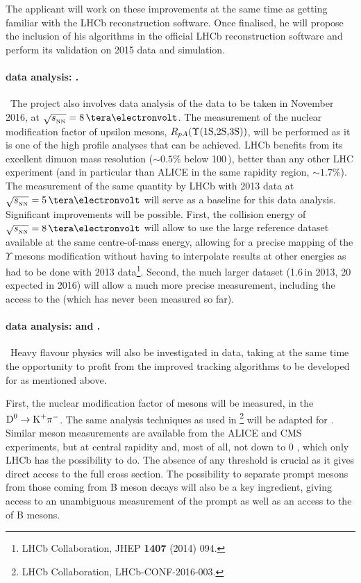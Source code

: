 \documentclass[a4paper,11pt]{article}
\begin{document}
The applicant will work on these improvements at the same time as getting familiar with the LHCb reconstruction software. Once finalised, he will propose the inclusion of his algorithms in the official LHCb reconstruction software and perform its validation on 2015 \pbpb data and simulation.


\paragraph{\pPb data analysis: \PgUabc. }\ 
The project also involves data analysis of the \pPb data to be taken in November 2016, at $\sqrtsnn = 8\,\TeV$. The measurement of the nuclear modification factor of upsilon mesons, $R_{pA} (\Upsilon\text{(1S,2S,3S)})$, will be performed as it is one of the high profile analyses that can be achieved. LHCb benefits from its excellent dimuon mass resolution ($\sim 0.5\%$ below 100\,\GeVc), better than any other LHC experiment (and in particular than ALICE in the same rapidity region, $\sim 1.7\%$). %
The measurement of the same quantity by LHCb with 2013 \pPb data at $\sqrtsnn = 5\,\TeV$ will serve as a baseline for this data analysis. Significant improvements will be possible. First, the collision energy of $\sqrtsnn = 8\,\TeV$ will allow to use the large \pp reference dataset available at the same centre-of-mass energy, allowing for a precise mapping of the $\Upsilon$ mesons modification without having to interpolate results at other energies as had to be done with 2013 \pPb data\footnote{LHCb Collaboration,
  JHEP {\bf 1407} (2014) 094.
  }.
Second, the much larger dataset (1.6\,\nbinv in 2013, 20\,\nbinv expected in 2016) will allow a much more precise measurement, including the access to the \PgUc (which \rpa has never been measured so far).


\paragraph{\pbpb data analysis: \Dz and \Jpsi. }\ 
Heavy flavour physics will also be investigated in \pbpb data, taking at the same time the opportunity to profit from the improved tracking algorithms to be developed for \pbpb as mentioned above. 

First, the nuclear modification factor of \Dz mesons will be measured, in the $\text{D}^0 \to \text{K}^+\pi^-$. The same analysis techniques as used in \pPb\footnote{LHCb Collaboration, LHCb-CONF-2016-003.} will be adapted for \pbpb. Similar \Dz meson measurements are available from the ALICE and CMS experiments, but at central rapidity and, most of all, not down to 0 \pt, which only LHCb has the possibility to do. The absence of any \pt threshold is crucial as it gives direct access to the full cross section. The possibility to separate
prompt \Dz mesons from those coming from B meson decays will also be a key ingredient, giving access to an unambiguous measurement of the prompt \Dz as well as an access to the \raa
of B mesons.
\end{document}
